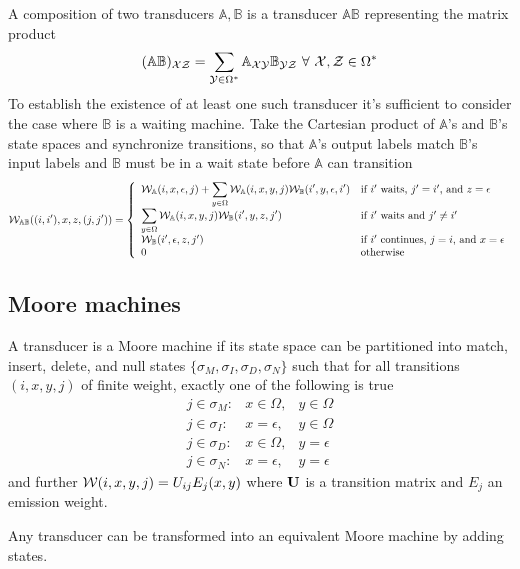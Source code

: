\documentclass{article}
\begin{document}
A composition of two transducers $\mathbb{A},\mathbb{B}$ is a transducer $\mathbb{AB}$ representing the matrix product
\[
(\mathbb{AB})_{{\cal XZ}} = \sum_{{\cal Y} \in \Omega^\ast} \mathbb{A}_{\cal XY} \mathbb{B}_{\cal YZ} \ \forall\ {\cal X},{\cal Z} \in \Omega^\ast
\]
To establish the existence of at least one such transducer it's sufficient to consider the case where $\mathbb{B}$ is a waiting machine.
Take the Cartesian product of $\mathbb{A}$'s and $\mathbb{B}$'s state spaces and synchronize transitions,
so that $\mathbb{A}$'s output labels match $\mathbb{B}$'s input labels and $\mathbb{B}$ must be in a wait state before $\mathbb{A}$ can transition
\[
  {\cal W}_{\mathbb{AB}}((i,i'),x,z,(j,j')) = \left\{
  \begin{array}{ll}
    {\cal W}_{\mathbb{A}}(i,x,\epsilon,j) + \displaystyle \sum_{y \in \Omega} {\cal W}_{\mathbb{A}}(i,x,y,j) {\cal W}_{\mathbb{B}}(i',y,\epsilon,i') & \mbox{if $i'$ waits, $j' = i'$, and $z = \epsilon$} \\
    \displaystyle \sum_{y \in \Omega} {\cal W}_{\mathbb{A}}(i,x,y,j) {\cal W}_{\mathbb{B}}(i',y,z,j') & \mbox{if $i'$ waits and $j' \neq i'$} \\
    {\cal W}_{\mathbb{B}}(i',\epsilon,z,j') & \mbox{if $i'$ continues, $j = i$, and $x = \epsilon$} \\
    0 & \mbox{otherwise}
  \end{array} \right.
\]

\subsection{Moore machines}

A transducer is a Moore machine if its state space can be partitioned into
match, insert, delete, and null states $\{ \sigma_M, \sigma_I, \sigma_D, \sigma_N \}$
such that for all transitions $(i,x,y,j)$ of finite weight, exactly one of the following is true
\begin{eqnarray*}
  j \in \sigma_M: & x \in \Omega, & y \in \Omega \\
  j \in \sigma_I: & x = \epsilon, & y \in \Omega \\
  j \in \sigma_D: & x \in \Omega, & y = \epsilon \\
  j \in \sigma_N: & x = \epsilon, & y = \epsilon
\end{eqnarray*}
and further ${\cal W}(i,x,y,j) = U_{ij} E_j(x,y)$ where ${\bf U}$ is a transition matrix and $E_j$ an emission weight.

Any transducer can be transformed into an equivalent Moore machine by adding states.
\end{document}

